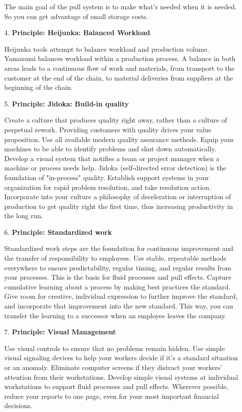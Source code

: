 \documentclass[11pt,a4paper]{article}
\begin{document}
\begin{enumerate}
  The main goal of the pull system is to make what's needed when it is needed.
  So you can get advantage of small storage costs.
    
\item[4.] \textbf{Principle: Heijunka: Balanced Workload}

  Heijunka tools attempt to balance workload and production volume.  Yamazumi
  balances workload within a production process. A balance in both areas leads
  to a continuous flow of work and materials, from transport to the customer
  at the end of the chain, to material deliveries from suppliers at the
  beginning of the chain.

\item[5.] \textbf{Principle: Jidoka: Build-in quality}

  Create a culture that produces quality right away, rather than a culture of
  perpetual rework. Providing customers with quality drives your value
  proposition. Use all available modern quality assurance methods. Equip your
  machines to be able to identify problems and shut down automatically.
  Develop a visual system that notifies a team or project manager when a
  machine or process needs help. Jidoka (self-directed error detection) is the
  foundation of "in-process" quality.  Establish support systems in your
  organization for rapid problem resolution, and take resolution action.
  Incorporate into your culture a philosophy of deceleration or interruption
  of production to get quality right the first time, thus increasing
  productivity in the long run.

\item[6.] \textbf{Principle: Standardized work}

  Standardized work steps are the foundation for continuous improvement and
  the transfer of responsibility to employees. Use stable, repeatable methods
  everywhere to ensure predictability, regular timing, and regular results
  from your processes. This is the basis for fluid processes and pull effects.
  Capture cumulative learning about a process by making best practices the
  standard. Give room for creative, individual expression to further improve
  the standard, and incorporate that improvement into the new standard. This
  way, you can transfer the learning to a successor when an employee leaves
  the company.
    
\item[7.] \textbf{Principle: Visual Management}

  Use visual controls to ensure that no problems remain hidden.  Use simple
  visual signaling devices to help your workers decide if it's a standard
  situation or an anomaly. Eliminate computer screens if they distract your
  workers' attention from their workstations.  Develop simple visual systems
  at individual workstations to support fluid processes and pull effects.
  Wherever possible, reduce your reports to one page, even for your most
  important financial decisions.


\end{enumerate}
\end{document}
